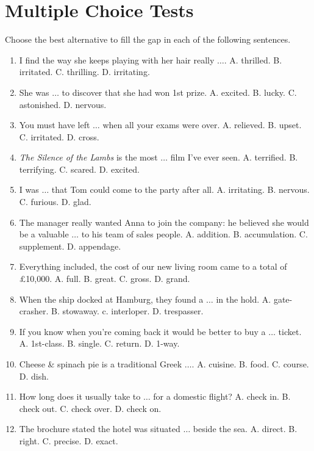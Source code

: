 \documentclass{article}
\numberwithin{equation}{section}
\begin{document}
\section{Multiple Choice Tests}
Choose the best alternative to fill the gap in each of the following sentences.
\begin{enumerate}[leftmargin=8mm]
	\item I find the way she keeps playing with her hair really $\ldots$. {\sf A.} thrilled. {\sf B.} irritated. {\sf C.} thrilling. {\sf D.} irritating.
	\item She was $\ldots$ to discover that she had won 1st prize. {\sf A.} excited. {\sf B.} lucky. {\sf C.} astonished. {\sf D.} nervous.
	\item You must have left $\ldots$ when all your exams were over. {\sf A.} relieved. {\sf B.} upset. {\sf C.} irritated. {\sf D.} cross.
	\item \textit{The Silence of the Lambs} is the most $\ldots$ film I've ever seen. {\sf A.} terrified. {\sf B.} terrifying. {\sf C.} scared. {\sf D.} excited.
	\item I was $\ldots$ that Tom could come to the party after all. {\sf A.} irritating. {\sf B.} nervous. {\sf C.} furious. {\sf D.} glad.
	\item The manager really wanted Anna to join the company: he believed she would be a valuable $\ldots$ to his team of sales people. {\sf A.} addition. {\sf B.} accumulation. {\sf C.} supplement. {\sf D.} appendage.
	\item Everything included, the cost of our new living room came to a total of \pounds10,000. {\sf A.} full. {\sf B.} great. {\sf C.} gross. {\sf D.} grand.
	\item When the ship docked at Hamburg, they found a $\ldots$ in the hold. {\sf A.} gate-crasher. {\sf B.} stowaway. c. interloper. {\sf D.} trespasser.
	\item If you know when you're coming back it would be better to buy a $\ldots$ ticket. {\sf A.} 1st-class. {\sf B.} single. {\sf C.} return. {\sf D.} 1-way.
	\item Cheese \& spinach pie is a traditional Greek $\ldots$. {\sf A.} cuisine. {\sf B.} food. {\sf C.} course. {\sf D.} dish.
	\item How long does it usually take to $\ldots$ for a domestic flight? {\sf A.} check in. {\sf B.} check out. {\sf C.} check over. {\sf D.} check on.
	\item The brochure stated the hotel was situated $\ldots$ beside the sea. {\sf A.} direct. {\sf B.} right. {\sf C.} precise. {\sf D.} exact.

\end{enumerate}
\end{document}

